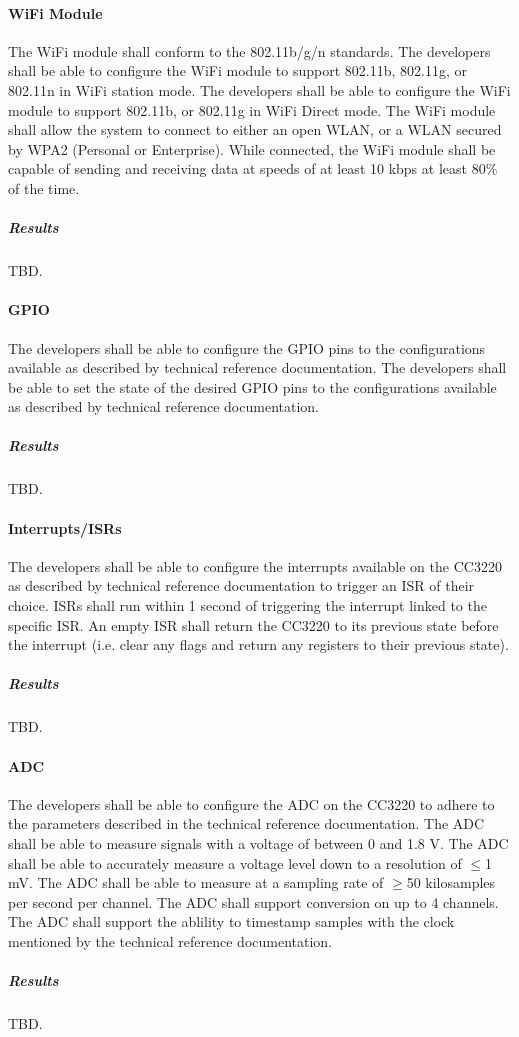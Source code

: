 \paragraph{WiFi Module} The WiFi module shall conform to the 802.11b/g/n
standards. The developers shall be able to configure the WiFi
module to support 802.11b, 802.11g, or 802.11n in WiFi station mode.  The 
developers shall be able to configure the WiFi module to support 802.11b, or
802.11g in WiFi Direct mode. The WiFi module shall allow the system to
connect to either an open WLAN, or a WLAN secured by WPA2 (Personal or
Enterprise). While
connected, the WiFi module shall be capable of sending and receiving
data at speeds of at least 10 kbps at least 80\% of the time.
\subparagraph{Results} TBD.

\paragraph{GPIO} The developers shall be able to configure the GPIO pins to
the configurations available as described by technical reference documentation.
The developers shall be able to set the state of the desired GPIO pins to
the configurations available as described by technical reference documentation.
\subparagraph{Results} TBD.

\paragraph{Interrupts/ISRs} The developers shall be able to configure
the interrupts available on the CC3220 as described by technical reference
documentation to trigger an ISR of their choice. ISRs shall run within 1 second
of triggering the interrupt linked to the specific ISR. An empty ISR shall
return the CC3220 to its previous state before the interrupt (i.e. clear any
flags and return any registers to their previous state).
\subparagraph{Results} TBD.

\paragraph{ADC} The developers shall be able to configure the ADC on the CC3220
to adhere to the parameters described in the technical reference documentation.
The ADC shall be able to measure signals with a voltage of between 0 and 1.8 V.
The ADC shall be able to accurately measure a voltage level down to a
resolution of $\leq$1 mV. The ADC shall be able to measure at a sampling rate
of $\geq$50 kilosamples per second per channel. The ADC shall support
conversion on up to 4 channels. The ADC shall support the ablility to timestamp
samples with the clock mentioned by the technical reference documentation.
\subparagraph{Results} TBD.

